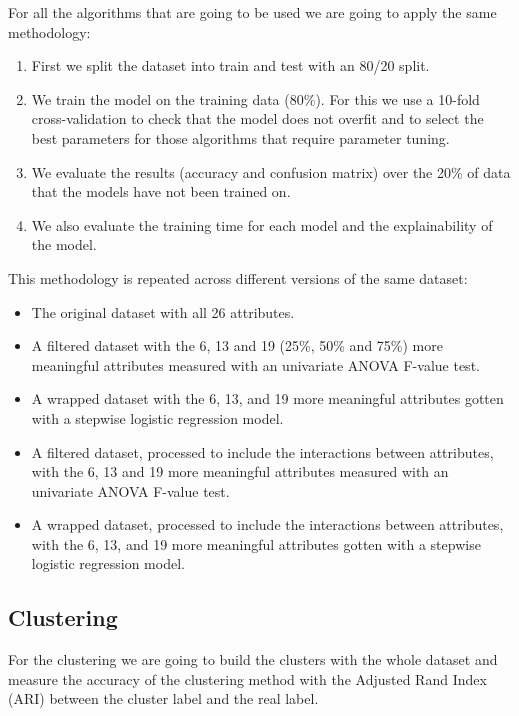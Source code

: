 \documentclass[a4paper,11pt]{article}
\begin{document}
For all the algorithms that are going to be used we are going to apply the same methodology:

\begin{enumerate}
	\item First we split the dataset into train and test with an 80/20 split.
	\item We train the model on the training data (80\%). For this we use a 10-fold cross-validation to check that the model does not overfit and to select the best parameters for those algorithms that require parameter tuning.
	\item We evaluate the results (accuracy and confusion matrix) over the 20\% of data that the models have not been trained on.
	\item We also evaluate the training time for each model and the explainability of the model.
\end{enumerate}

This methodology is repeated across different versions of the same dataset:

\begin{itemize}
	\item The original dataset with all 26 attributes.
	\item A filtered dataset with the 6, 13 and 19 (25\%, 50\% and 75\%) more meaningful attributes measured with an univariate ANOVA F-value test.
	\item A wrapped dataset with the 6, 13, and 19 more meaningful attributes gotten with a stepwise logistic regression model.
	\item A filtered dataset, processed to include the interactions between attributes, with the 6, 13 and 19 more meaningful attributes  measured with an univariate ANOVA F-value test.
	\item A wrapped dataset, processed to include the interactions between attributes, with the 6, 13, and 19 more meaningful attributes gotten with a stepwise logistic regression model.
\end{itemize}

\subsection{Clustering}

For the clustering we are going to build the clusters with the whole dataset and measure the accuracy of the clustering method with the Adjusted Rand Index (ARI) between the cluster label and the real label.
\end{document}
